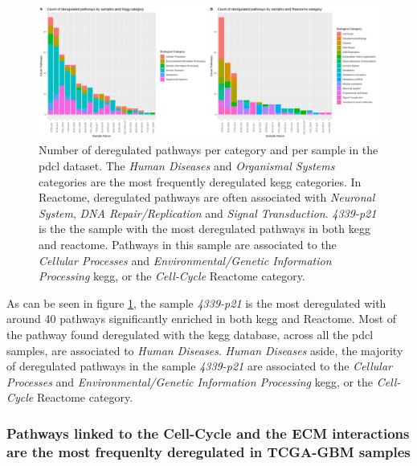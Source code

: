 \begin{figure}
    \includegraphics[width=\textwidth]{img/barplot-categ-pdcl}
    \caption{
        Number of deregulated pathways per category and per sample in the \acrshort{pdcl} dataset.
        The  \textit{Human Diseases} and \textit{Organismal Systems} categories are the most frequently deregulated \acrshort{kegg} categories.
        In Reactome, deregulated pathways are often associated with \textit{Neuronal System}, \textit{DNA Repair/Replication} and \textit{Signal Transduction}.
        \textit{4339-p21} is the the sample with the most deregulated pathways in both \acrshort{kegg} and reactome.
        Pathways in this sample are associated to the \textit{Cellular Processes} and \textit{Environmental/Genetic Information Processing} \acrshort{kegg}, or the \textit{Cell-Cycle} Reactome category.
    }
    \label{fig:barplot-categ-pdcl}
\end{figure}

As can be seen in figure \ref*{fig:barplot-categ-pdcl}, the sample \textit{4339-p21} is the most deregulated with around 40 pathways significantly enriched in both \acrshort{kegg} and Reactome.
Most of the pathway found deregulated with the \acrshort{kegg} database, across all the \acrshort{pdcl} samples, are associated to \textit{Human Diseases}.
\textit{Human Diseases} aside, the majority of deregulated pathways in the sample \textit{4339-p21} are associated to the \textit{Cellular Processes} and \textit{Environmental/Genetic Information Processing} \acrshort{kegg}, or the \textit{Cell-Cycle} Reactome category.

\subsubsection{Pathways linked to the Cell-Cycle and the ECM interactions are the most frequenlty deregulated in TCGA-GBM samples}

